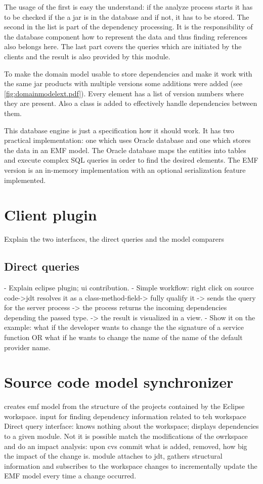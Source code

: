 The usage of the first is easy the understand: if the analyze process starts it
has to be checked if the a jar is in the database and if not, it has to be
stored. The second in the list is part of the dependency processing. It is the
responsibility of the database component how to represent the data and thus
finding references also belongs here. The last part covers the queries which are
initiated by the clients and the result is also provided by this module.

To make the domain model usable to store dependencies and make it work with the
same jar products with multiple versions some additions were added (see
\autoref{fig:domainmodelext.pdf}).  Every element has a list of version numbers where they are
present. Also a  class is added to effectively handle
dependencies between them.

This database engine is just a specification how it should work. It has two
practical implementation: one which uses Oracle database and one which stores
the data in an EMF model. The Oracle database maps the entities into tables and
execute complex SQL queries in order to find the desired elements.
The EMF version is an in-memory implementation with an optional serialization
feature implemented. 

\section{Client plugin}
Explain the two interfaces, the direct queries and the model comparers


\subsection{Direct queries}
- Explain eclipse plugin; ui contribution.
- Simple workflow: right click on source code->jdt resolves it as a
class-method-field-> fully qualify it -> sends the query for the server process
-> the process returns the incoming dependencies depending the passed type. ->
the result is visualized in a view.
- Show it on the example: what if the developer wants to change the the
signature of a service function OR what if he wants to change the name of the
name of the default provider name.

\section{Source code model synchronizer}
creates emf model from the structure of the projects contained by the Eclipse
workspace.
input for finding dependency information related to teh workspace Direct query
interface: knows nothing about the workspace; displays  dependencies to a given
module.
Not it is possible match the modifications of the owrkspace and do an impact
analysis: upon cvs commit what is added, removed, how big the impact of the
change is.
module attaches to jdt, gathers structural information and subscribes to the
workspace changes to incrementally update the EMF model every time a change
occurred.

